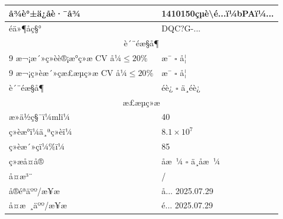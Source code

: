 \documentclass[UTF8,10pt,a4paper,fontset=fandol]{ctexart}
\newcommand{\fieldvalue}[1]{#1}
\newcommand{\handwritten}[1]{#1}
\begin{document}
\begin{center}
\begin{center}
\begin{tabularx}{\textwidth}{|p{}|X|}
\hline
å¾è°±ä¿å­è·¯å¾ &
\fieldvalue{\handwritten{1410150çµè\textbackslash é...ï¼bPAï¼...}} \\
\hline
éä»¶åç§° &
\fieldvalue{\handwritten{DQC?G-...}} \\
\hline
\multicolumn{2}{|c|}{è´¨éæ§å¶} \\
\hline
9 æ¬¡æ´»ç»èè®¡æ°ç»æ CV å¼$\leq 20\%$ &
\fieldvalue{\handwritten{\checkmark}} æ¯ \quad $\square$ å¦ \\
\hline
9 æ¬¡ç»èæ´»çæ£æµç»æ CV å¼$\leq 20\%$ &
\fieldvalue{\handwritten{\checkmark}} æ¯ \quad $\square$ å¦ \\
\hline
è´¨éæ§å¶ &
\fieldvalue{\handwritten{\checkmark}} éè¿ \quad $\square$ ä¸éè¿ \\
\hline
\multicolumn{2}{|c|}{æ£æµç»æ} \\
\hline
æ»ä½ç§¯ï¼mlï¼ &
\fieldvalue{\handwritten{40}} \\
\hline
ç»èæ°ï¼ä¸ªç»èï¼ &
\fieldvalue{\handwritten{$8.1\times10^{7}$}} \\
\hline
ç»èæ´»çï¼\%ï¼ &
\fieldvalue{\handwritten{85}} \\
\hline
ç»æå¤å® &
\fieldvalue{\handwritten{\checkmark}} åæ ¼ \quad $\square$ ä¸åæ ¼ \\
\hline
å¤æ³¨ &
\fieldvalue{\handwritten{/}} \\
\hline
å®éªäºº/æ¥æ &
\fieldvalue{\handwritten{å­...}}\quad
\fieldvalue{\handwritten{2025.07.29}} \\
\hline
å¤æ ¸äºº/æ¥æ &
\fieldvalue{\handwritten{é­...}}\quad
\fieldvalue{\handwritten{2025.07.29}} \\
\hline
\end{tabularx}


\end{center}
\end{center}
\end{document}
